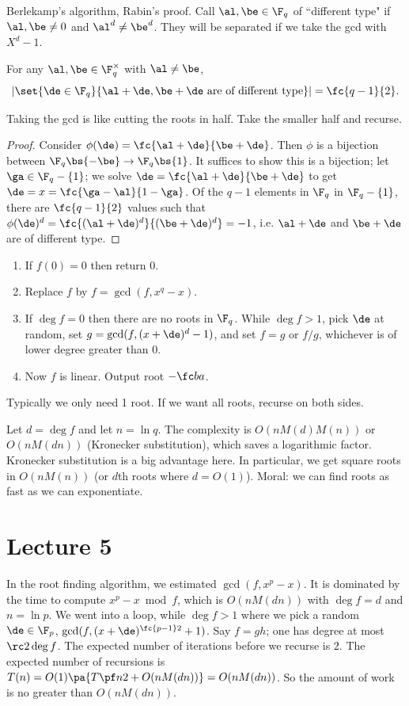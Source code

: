 Berlekamp's algorithm, Rabin's proof.
Call $\al,\be\in \F_q$ of ``different type" if $\al,\be\ne 0$ and $\al^d\ne \be^d$. They will be separated if we take the gcd with $X^d-1$.
\begin{thm}
For any $\al,\be\in \F_q^{\times}$ with $\al\ne \be$, 
\[
|\set{\de\in \F_q}{\al+\de,\be+\de \text{ are of different type}}|=\fc{q-1}{2}.
\]
\end{thm}
Taking the gcd is like cutting the roots in half. Take the smaller half and recurse.
\begin{proof}
Consider $\phi(\de)=\fc{\al+\de}{\be+\de}$. Then $\phi$ is a bijection between $\F_q\bs\{-\be\}\to \F_q\bs \{1\}$. It suffices to show this is a bijection; let $\ga\in \F_q-\{1\}$; we solve $\de=\fc{\al+\de}{\be+\de}$ %
to get $\de=x=\fc{\ga-\al}{1-\ga}$. Of the $q-1$ elements in $\F_q$ in $\F_q-\{1\}$, there are $\fc{q-1}{2}$ values such that $\phi(\de)^d=\fc{(\al+\de)^d}{(\be+\de)^d}=-1$, i.e. $\al+\de$ and $\be +\de$ are of different type.
\end{proof}
\begin{alg}
\begin{enumerate}
\item
If $f(0)=0$ then return 0.
\item Replace $f$ by $f=\gcd(f,x^q-x)$.
\item If $\deg f=0$ then there are no roots in $\F_q$. While $\deg f>1$, pick $\de$ at random, set $g=\gcd(f,(x+\de)^d-1)$, and set $f=g$ or $f/g$, whichever is of lower degree greater than 0.
\item Now $f$ is linear. Output root $-\fc ba$.
\end{enumerate}
\end{alg}
Typically we only need 1 root. If we want all roots, recurse on both sides.

Let $d=\deg f$ and let $n=\ln q$. The complexity is $O(nM(d)M(n))$ %
or $O(nM(dn))$ (Kronecker substitution), which saves a logarithmic factor. Kronecker substitution is a big advantage here. In particular, we get square roots in $O(nM(n))$ (or $d$th roots where $d=O(1)$). Moral: we can find roots as fast as we can exponentiate.
\section{Lecture 5}
In the root finding algorithm, we estimated $\gcd(f,x^p-x)$. It is dominated by the time to compute $x^p-x\bmod f$, which is $O(nM(dn))$ with $\deg f=d$ and $n=\ln p$. We went into a loop, while $\deg f>1$ where we pick a random $\de\in \F_p$, $\gcd(f,(x+\de)^{\fc{p-1}2}+1)$. Say $f=gh$; one has degree at most $\rc 2\deg f$. The expected number of iterations before we recurse is 2. The expected number of recursions is $T(n)=O(1)\pa{T\pf n2+O(nM(dn))}=O(nM(dn))$. So the amount of work is no greater than $O(nM(dn))$. 

